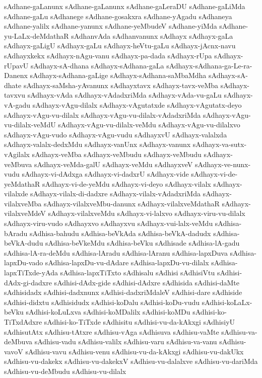 {sAdhane-gaLanunx
sAdhane-gaLanunx
sAdhane-gaLeraDU
sAdhane-gaLiMda
sAdhane-gaLu
sAdhanege
sAdhane-gosakxra
sAdhane-yAgadu
sAdhaneya
sAdhane-yalilx
sAdhane-yanunx
sAdhane-yeMbudeV
sAdhane-yiMda
sAdhane-yu-LaLx-deMdathaR
sAdhanvAda
sAdhanvanunx
sAdhayx
sAdhayx-gaLa
sAdhayx-gaLigU
sAdhayx-gaLu
sAdhayx-heVtu-gaLu
sAdhayx-jAcnx-navu
sAdhayxkekx
sAdhayx-nAgu-vanu
sAdhayx-pa-dada
sAdhayx-rUpa
sAdhayx-rUpavU
sAdhayx-sA-dhana
sAdhayx-sAdhana-gaLa
sAdhayx-sAdhana-ga-Le-ra-Danenx
sAdhayx-sAdhana-gaLige
sAdhayx-sAdhana-saMbaMdha
sAdhayx-sA-dhate
sAdhayx-saMsha-yAvanunx
sAdhayxtavx
sAdhayx-tavx-veMba
sAdhayx-tavxvu
sAdhayx-vAda
sAdhayx-vAdadxriMda
sAdhayx-vAda-vu-gaLu
sAdhayx-vA-gadu
sAdhayx-vAgu-dilalx
sAdhayx-vAgutatxde
sAdhayx-vAgutatx-deyo
sAdhayx-vAgu-vu-dilalx
sAdhayx-vAgu-vu-dilalx-vAdadxriMda
sAdhayx-vAgu-vu-dilalx-veMdU
sAdhayx-vAgu-vu-dilalx-veMdu
sAdhayx-vAgu-vu-dilalxvo
sAdhayx-vAgu-vudo
sAdhayx-vAgu-vudu
sAdhayxvU
sAdhayx-valalxda
sAdhayx-valalx-dedxMdu
sAdhayx-vanUnx
sAdhayx-vanunx
sAdhayx-va-sutx-vAgilalx
sAdhayx-veMba
sAdhayx-veMbudu
sAdhayx-veMbudu
sAdhayx-veMbuva
sAdhayx-veMda-galU
sAdhayx-veMdu
sAdhayxveV
sAdhayx-ve-nunx-vudu
sAdhayx-vi-dAdxga
sAdhayx-vi-dadxrU
sAdhayx-vide
sAdhayx-vi-de-yeMdathaR
sAdhayx-vi-de-yeMdu
sAdhayx-vi-deyo
sAdhayx-vilalx
sAdhayx-vilalxde
sAdhayx-vilalx-di-dadxre
sAdhayx-vilalx-vAdadxriMda
sAdhayx-vilalxveMba
sAdhayx-vilalxveMbu-danunx
sAdhayx-vilalxveMdathaR
sAdhayx-vilalxveMdeV
sAdhayx-vilalxveMdu
sAdhayx-vi-lalxvo
sAdhayx-viru-vu-dilalx
sAdhayx-viru-vudo
sAdhayxvo
sAdhayxvu
sAdhayx-vui-lalx-veMdu
sAdhisa-bAradu
sAdhisa-bahudu
sAdhisa-beVkAda
sAdhisa-beVkA-dadudx
sAdhisa-beVkA-dudu
sAdhisa-beVkeMdu
sAdhisa-beVku
sAdhisade
sAdhisa-lA-gadu
sAdhisa-lA-ra-deMdu
sAdhisa-lAradu
sAdhisa-lAranu
sAdhisa-lapxDuva
sAdhisa-lapxDu-vado
sAdhisa-lapxDu-vu-dAdare
sAdhisa-lapxDu-vu-dilalx
sAdhisa-lapxTiTxde-yAda
sAdhisa-lapxTiTxto
sAdhisalu
sAdhisi
sAdhisiVtu
sAdhisi-dAdx-gi-dadxre
sAdhisi-dAdx-gide
sAdhisi-dAdxre
sAdhisida
sAdhisi-daMte
sAdhisidadx
sAdhisi-dadxnunx
sAdhisi-dadxriMdaleV
sAdhisi-dare
sAdhiside
sAdhisi-didxtu
sAdhisidudx
sAdhisi-koDalu
sAdhisi-koDu-vudu
sAdhisi-koLaLx-beVku
sAdhisi-koLuLxva
sAdhisi-koMDalilx
sAdhisi-koMDu
sAdhisi-ko-TiTxdAdxre
sAdhisi-ko-TiTxde
sAdhisitu
sAdhisi-vu-da-kAkxgi
sAdhisiyU
sAdhisutAtx
sAdhisu-tAtxre
sAdhisu-vAga
sAdhisuva
sAdhisu-vaMte
sAdhisu-va-deMbuva
sAdhisu-vadu
sAdhisu-valilx
sAdhisu-varu
sAdhisu-va-vanu
sAdhisu-vavoV
sAdhisu-vavu
sAdhisu-venu
sAdhisu-vu-da-kAkxgi
sAdhisu-vu-dakUkx
sAdhisu-vu-dakekx
sAdhisu-vu-dakekxV
sAdhisu-vu-dalalxve
sAdhisu-vu-dariMda
sAdhisu-vu-deMbudu
sAdhisu-vu-dilalx
}
